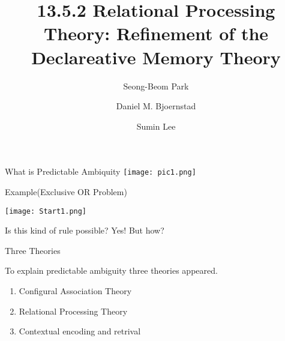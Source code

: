 \documentclass{beamer}
\title[Some title] %
{13.5.2 Relational Processing Theory: Refinement of the Declareative Memory Theory}
\author %
{Seong-Beom Park  \and Daniel M. Bjoernstad \and Sumin Lee}
\begin{document}
\begin{frame}
  \titlepage
\end{frame}







\begin{frame}{What is Predictable Ambiquity}{}
		\centering
		\texttt{[image: pic1.png]}
\end{frame}


\begin{frame}{Example(Exclusive OR Problem)}
		\begin{minipage}{\linewidth}
		\centering
		\texttt{[image: Start1.png]}
			
		\end{minipage}
		\centering
		\begin{minipage}{\linewidth}
				\centerline{Is this kind of rule possible? Yes! But how?}
		\end{minipage}
\end{frame}

\begin{frame}{Three Theories}
		\centerline{To explain predictable ambiguity three theories appeared.}
		\begin{enumerate}
			\item
					Configural Association Theory
			\item
					\alert{Relational Processing Theory}
			\item
					Contextual encoding and retrival 
					
			
		\end{enumerate}
\end{frame}
\end{document}
